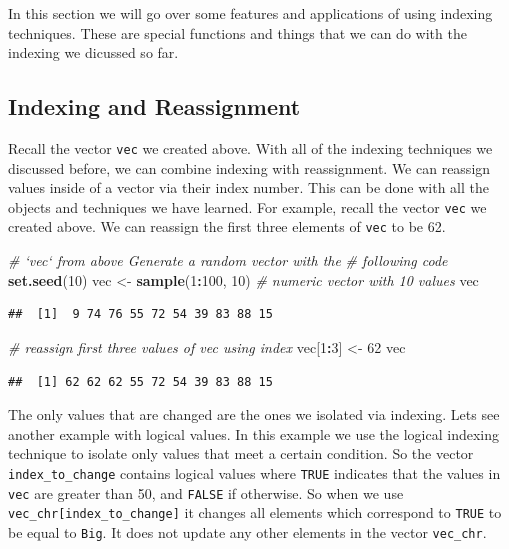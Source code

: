 \documentclass[
]{book}
\newenvironment{Shaded}{\begin{snugshade}}{\end{snugshade}}
\newcommand{\CommentTok}[1]{\textcolor[rgb]{0.56,0.35,0.01}{\textit{#1}}}
\newcommand{\DecValTok}[1]{\textcolor[rgb]{0.00,0.00,0.81}{#1}}
\newcommand{\KeywordTok}[1]{\textcolor[rgb]{0.13,0.29,0.53}{\textbf{#1}}}
\newcommand{\NormalTok}[1]{#1}
\newcommand{\OperatorTok}[1]{\textcolor[rgb]{0.81,0.36,0.00}{\textbf{#1}}}
\newcommand{\StringTok}[1]{\textcolor[rgb]{0.31,0.60,0.02}{#1}}
\begin{document}
In this section we will go over some features and applications of using indexing techniques. These are special functions and things that we can do with the indexing we dicussed so far.

\hypertarget{indexing-and-reassignment}{%
\subsection{Indexing and Reassignment}\label{indexing-and-reassignment}}

Recall the vector \texttt{vec} we created above. With all of the indexing techniques we discussed before, we can combine indexing with reassignment. We can reassign values inside of a vector via their index number. This can be done with all the objects and techniques we have learned. For example, recall the vector \texttt{vec} we created above. We can reassign the first three elements of \texttt{vec} to be 62.

\begin{Shaded}
\begin{Highlighting}[]
\CommentTok{# `vec` from above Generate a random vector with the}
\CommentTok{# following code}
\KeywordTok{set.seed}\NormalTok{(}\DecValTok{10}\NormalTok{)}
\NormalTok{vec <-}\StringTok{ }\KeywordTok{sample}\NormalTok{(}\DecValTok{1}\OperatorTok{:}\DecValTok{100}\NormalTok{, }\DecValTok{10}\NormalTok{)  }\CommentTok{# numeric vector with 10 values}
\NormalTok{vec}
\end{Highlighting}
\end{Shaded}

\begin{verbatim}
##  [1]  9 74 76 55 72 54 39 83 88 15
\end{verbatim}

\begin{Shaded}
\begin{Highlighting}[]
\CommentTok{# reassign first three values of vec using index}
\NormalTok{vec[}\DecValTok{1}\OperatorTok{:}\DecValTok{3}\NormalTok{] <-}\StringTok{ }\DecValTok{62}
\NormalTok{vec}
\end{Highlighting}
\end{Shaded}

\begin{verbatim}
##  [1] 62 62 62 55 72 54 39 83 88 15
\end{verbatim}

The only values that are changed are the ones we isolated via indexing. Lets see another example with logical values. In this example we use the logical indexing technique to isolate only values that meet a certain condition. So the vector \texttt{index\_to\_change} contains logical values where \texttt{TRUE} indicates that the values in \texttt{vec} are greater than 50, and \texttt{FALSE} if otherwise. So when we use \texttt{vec\_chr{[}index\_to\_change{]}} it changes all elements which correspond to \texttt{TRUE} to be equal to \texttt{Big}. It does not update any other elements in the vector \texttt{vec\_chr}.
\end{document}
